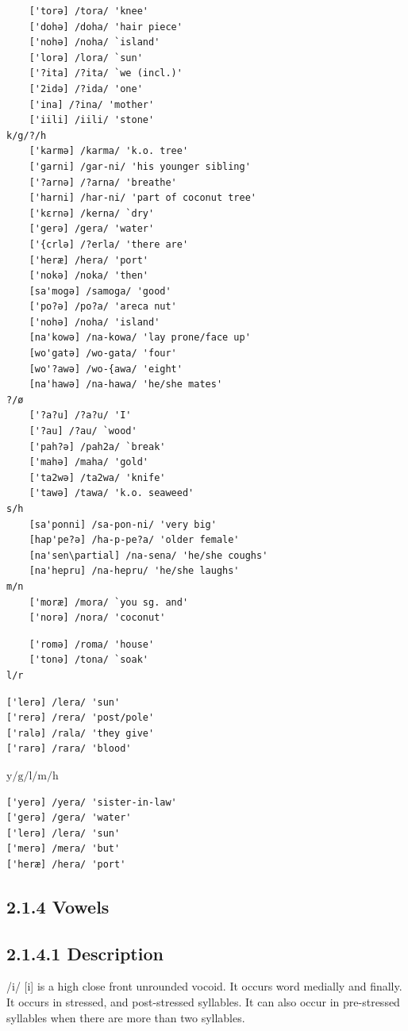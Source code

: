 \documentclass[10pt]{article}
\begin{document}
\begin{verbatim}
    ['torə] /tora/ 'knee'
    ['dohә] /doha/ 'hair piece'
    ['nohә] /noha/ `island'
    ['lorə] /lora/ `sun'
    ['?ita] /?ita/ `we (incl.)'
    ['2idə] /?ida/ 'one'
    ['ina] /?ina/ 'mother'
    ['iili] /iili/ 'stone'
k/g/?/h
    ['karmә] /karma/ 'k.o. tree'
    ['garni] /gar-ni/ 'his younger sibling'
    ['?arnә] /?arna/ 'breathe'
    ['harni] /har-ni/ 'part of coconut tree'
    ['kɛrnә] /kerna/ `dry'
    ['gerә] /gera/ 'water'
    ['{crlə] /?erla/ 'there are'
    ['heræ] /hera/ 'port'
    ['nokә] /noka/ 'then'
    [sa'mogә] /samoga/ 'good'
    ['po?ә] /po?a/ 'areca nut'
    ['nohә] /noha/ 'island'
    [na'kowə] /na-kowa/ 'lay prone/face up'
    [wo'gatə] /wo-gata/ 'four'
    [wo'?awә] /wo-{awa/ 'eight'
    [na'hawə] /na-hawa/ 'he/she mates'
?/ø
    ['?a?u] /?a?u/ 'I'
    ['?au] /?au/ `wood'
    ['pah?ә] /pah2a/ `break'
    ['mahә] /maha/ 'gold'
    ['ta2wә] /ta2wa/ 'knife'
    ['tawə] /tawa/ 'k.o. seaweed'
s/h
    [sa'ponni] /sa-pon-ni/ 'very big'
    [hap'pe?ә] /ha-p-pe?a/ 'older female'
    [na'sen\partial] /na-sena/ 'he/she coughs'
    [na'hepru] /na-hepru/ 'he/she laughs'
m/n
    ['moræ] /mora/ `you sg. and'
    ['norə] /nora/ 'coconut'
\end{verbatim}

\begin{verbatim}
    ['romә] /roma/ 'house'
    ['tonә] /tona/ `soak'
l/r
\end{verbatim}

\begin{verbatim}
['lerə] /lera/ 'sun'
['rerә] /rera/ 'post/pole'
['ralə] /rala/ 'they give'
['rarə] /rara/ 'blood'
\end{verbatim}

\(\mathrm{y} / \mathrm{g} / \mathrm{l} / \mathrm{m} / \mathrm{h}\)

\begin{verbatim}
['yerә] /yera/ 'sister-in-law'
['gerә] /gera/ 'water'
['lerə] /lera/ 'sun'
['merә] /mera/ 'but'
['heræ] /hera/ 'port'
\end{verbatim}

\subsection*{2.1.4 Vowels}
\subsection*{2.1.4.1 Description}
/i/ [i] is a high close front unrounded vocoid. It occurs word medially and finally. It occurs in stressed, and post-stressed syllables. It can also occur in pre-stressed syllables when there are more than two syllables.
\end{document}
